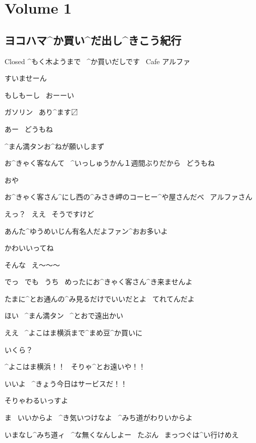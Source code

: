 \section{Volume 1}

\subsection{ヨコハマ^{か}{買}い^{だ}{出}し^{きこう}{紀行}}

\page[9]
\Sign Closed ^{もく}{木}ようまで
\ ^{か}{買}いだしです
\ Cafe アルファ

\page[10]
\Alpha すいませーん

\Alpha もしもーし
\ おーーい

\Sign ガソリン
\ あり^{ます}{〼}

\page[11]
\Ojisan あー
\ どうもね

\Alpha ^{まん}{満}タンお^{ねが}{願}いしまず

\Ojisan お^{きゃく}{客}なんて
\ ^{いっしゅうかん}{１週間}ぶりだから
\ どうもね

\Ojisan おや

\page[12]
\Ojisan お^{きゃく}{客}さん^{にし}{西}の^{みさき}{岬}のコーヒー^{や}{屋}さんだべ
\ アルファさん

\Alpha えっ？
\ ええ
\ そうですけど

\Ojisan あんた^{ゆうめいじん}{有名人}だよファン^{おお}{多}いよ

\Ojisan かわいいってね

\Alpha そんな
\ え〜〜〜

\Alpha でっ
\ でも
\ うち
\ めったにお^{きゃく}{客}さん^{き}{来}ませんよ

\Ojisan たまに^{とお}{通}んの^{み}{見}るだけでいいだとよ
\ てれてんだよ

\page[13]
\Ojisan ほい
\ ^{まん}{満}タン
\ ^{とおで}{遠出}かい

\Alpha ええ
\ ^{よこはま}{横浜}まで^{まめ}{豆}^{か}{買}いに

\Alpha いくら？

\Ojisan ^{よこはま}{横浜}！！
\ そりゃ^{とお}{遠}いや！！

\Ojisan いいよ
\ ^{きょう}{今日}はサービスだ！！

\Alpha そりゃわるいっすよ

\Ojisan ま
\ いいからよ
\ ^{き}{気}いつけなよ
\ ^{みち}{道}がわりいからよ

\Ojisan いまなし^{みち}{道}ィ
\ ^{な}{無}くなんしよー
\ たぶん
\ まっつぐは^{い}{行}けめえ

